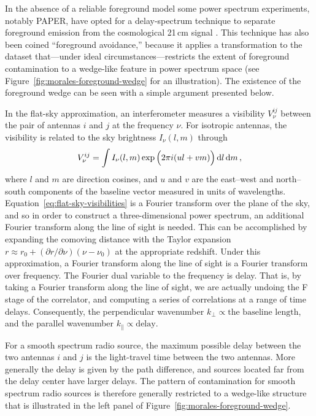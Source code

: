 \begin{bibunit}
In the absence of a reliable foreground model some power spectrum experiments, notably PAPER, have
opted for a delay-spectrum technique to separate foreground emission from the cosmological 21\,cm
signal \citep{2012ApJ...756..165P}. This technique has also been coined ``foreground avoidance,''
because it applies a transformation to the dataset that---under ideal circumstances---restricts the
extent of foreground contamination to a wedge-like feature in power spectrum space (see
Figure~\ref{fig:morales-foreground-wedge} for an illustration). The existence of the foreground
wedge can be seen with a simple argument presented below.

In the flat-sky approximation, an interferometer measures a visibility $V^{ij}_\nu$ between the
pair of antennas $i$ and $j$ at the frequency $\nu$. For isotropic antennas, the visibility is
related to the sky brightness $I_\nu(l, m)$ through
\begin{equation}\label{eq:flat-sky-visibilities}
    V^{ij}_\nu = \int I_\nu(l, m) \exp\Big(2\pi i (ul + vm)\Big)\,{\textrm d} l\,{\textrm d} m\,,
\end{equation}
where $l$ and $m$ are direction cosines, and $u$ and $v$ are the east--west and north--south
components of the baseline vector measured in units of wavelengths.
Equation~\ref{eq:flat-sky-visibilities} is a Fourier transform over the plane of the sky, and so in
order to construct a three-dimensional power spectrum, an additional Fourier transform along the
line of sight is needed. This can be accomplished by expanding the comoving distance with the Taylor
expansion $r \approx r_0 + (\partial r/\partial \nu)(\nu - \nu_0)$ at the appropriate redshift.
Under this approximation, a Fourier transform along the line of sight is a Fourier transform over
frequency.  The Fourier dual variable to the frequency is delay. That is, by taking a Fourier
transform along the line of sight, we are actually undoing the F stage of the correlator, and
computing a series of correlations at a range of time delays.  Consequently, the perpendicular
wavenumber $k_\perp \propto \text{the baseline length}$, and the parallel wavenumber $k_\parallel
\propto \text{delay}$.

For a smooth spectrum radio source, the maximum possible delay between the two antennas $i$ and $j$
is the light-travel time between the two antennas. More generally the delay is given by the path
difference, and sources located far from the delay center have larger delays. The pattern of
contamination for smooth spectrum radio sources is therefore generally restricted to a wedge-like
structure that is illustrated in the left panel of Figure~\ref{fig:morales-foreground-wedge}.






\end{bibunit}
